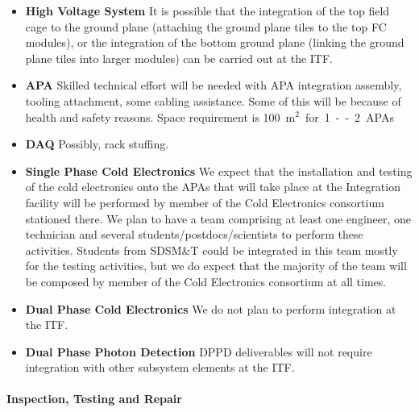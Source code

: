 \begin{itemize}
  \item {\bf High Voltage System} It is possible that the integration
    of the top field cage to the ground plane (attaching the ground
    plane tiles to the top FC modules), or the integration of the
    bottom ground plane (linking the ground plane tiles into larger
    modules) can be carried out at the ITF.
  \item {\bf APA} Skilled technical effort will be needed with APA
    integration assembly, tooling attachment, some cabling
    assistance. Some of this will be because of health and safety
    reasons. Space requirement is \SI{100}{m$^2$} for 1--2 APAs
  \item {\bf DAQ} Possibly, rack stuffing.
  \item {\bf Single Phase Cold Electronics} We expect that the
    installation and testing of the cold electronics onto the APAs
    that will take place at the Integration facility will be performed
    by member of the Cold Electronics consortium stationed there. We
    plan to have a team comprising at least one engineer, one
    technician and several students/postdocs/scientists to perform
    these activities. Students from SDSM\&T could be integrated in
    this team mostly for the testing activities, but we do expect that
    the majority of the team will be composed by member of the Cold
    Electronics consortium at all times.
   \item {\bf Dual Phase Cold Electronics} We do not plan to perform integration at the ITF.
   \item {\bf Dual Phase Photon Detection} DPPD deliverables will not
     require integration with other subsystem elements at the ITF.
\end{itemize}

\paragraph{\bf Inspection, Testing and Repair}

